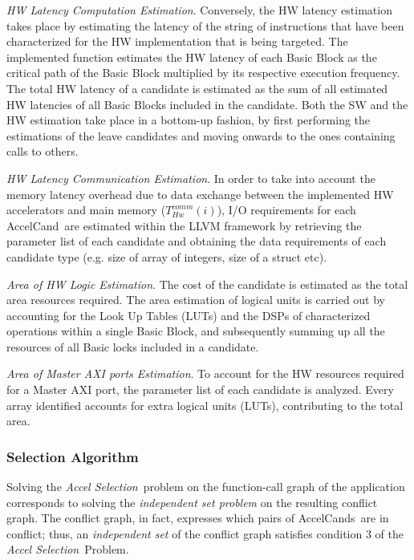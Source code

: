 \documentclass[]{usiinfthesis}
\newcommand{\candidate}{{AccelCand}}
\newcommand{\candidates}{{AccelCand}s}
\newcommand{\probname}{\emph{Accel Selection}}
\begin{document}
\emph{HW Latency Computation Estimation}. Conversely, the HW latency
estimation takes place by estimating the latency of the string of
instructions that have been characterized for the HW implementation
that is being targeted. The implemented function estimates the HW
latency of each Basic Block as the critical path of the Basic Block
multiplied by its respective execution frequency. The total HW latency
of a candidate is estimated as the
sum of all estimated HW latencies of all Basic Blocks included in the candidate. 
Both the SW and the HW estimation take place in a bottom-up fashion,
by first performing the estimations of the leave candidates and moving
onwards to the ones containing calls to others.\par

\emph{HW Latency Communication Estimation}. In order to take into
account the memory latency overhead due to data exchange between the
implemented HW accelerators and main memory ($T_{Hw}^{comm}(i)$), 
I/O requirements for each \candidate\ are
estimated within the LLVM framework by retrieving the parameter list
of each candidate and obtaining the data requirements of
each candidate type (e.g. size of array of integers, size of a struct etc).\par

\emph{Area of HW Logic Estimation}. The cost of the candidate is
estimated as the total area resources required. The area estimation
of logical units is carried out by accounting for the Look Up Tables
(LUTs) and the DSPs of characterized operations within a single Basic
Block, and subsequently summing up all the resources of all Basic
locks included in a candidate.\par

\emph{Area of Master AXI ports Estimation}. To account for the HW
resources required for a Master AXI port, the parameter list of each
candidate is analyzed. Every array identified accounts for extra
logical units (LUTs), contributing to the total area.

\subsubsection{Selection Algorithm}

Solving the \probname\ problem on the function-call graph of the
application corresponds to solving the \emph{independent set
  problem} on the resulting conflict graph. The conflict graph, in
fact, expresses which pairs of \candidates\ are in conflict; thus, an
\emph{independent set} of the conflict graph satisfies condition $3$ of the
\probname\ Problem.
\end{document}
